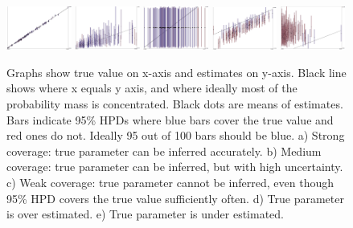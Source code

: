 \documentclass[oneside,twocolumn]{article}
\begin{document}
\begin{figure}
\includegraphics[width=0.19\textwidth]{../figures/bargraph-ok-strong}
\includegraphics[width=0.19\textwidth]{../figures/bargraph-ok-medium}
\includegraphics[width=0.19\textwidth]{../figures/bargraph-ok-weak}
\includegraphics[width=0.19\textwidth]{../figures/bargraph-under}
\includegraphics[width=0.19\textwidth]{../figures/bargraph-over}
\caption{\label{fig:coverage}
Graphs show true value on x-axis and estimates on y-axis. Black line shows where x equals y axis, and where ideally most of the probability mass is concentrated. Black dots are means of estimates. Bars indicate 95\% HPDs where blue bars cover the true value and red ones do not. Ideally 95 out of 100 bars should be blue.
a) Strong coverage: true parameter can be inferred accurately.
b) Medium coverage: true parameter can be inferred, but with high uncertainty.
c) Weak coverage: true parameter cannot be inferred, even though 95\% HPD covers the true value sufficiently often.
d) True parameter is over estimated.
e) True parameter is under estimated.
}
\end{figure}


\vspace{1cm}


\vspace{1cm}
\end{document}
